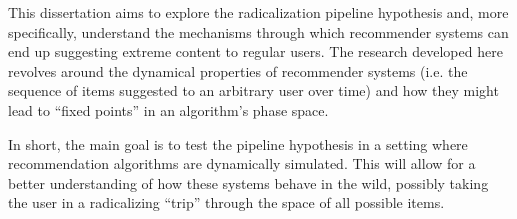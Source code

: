 This dissertation aims to explore the radicalization pipeline hypothesis and,
more specifically, understand the mechanisms through which recommender systems
can end up suggesting extreme content to regular users. The research developed
here revolves around the dynamical properties of recommender systems (i.e. the
sequence of items suggested to an arbitrary user over time) and how they might
lead to ``fixed points'' in an algorithm's phase space.

In short, the main goal is to test the pipeline hypothesis in a setting where
recommendation algorithms are dynamically simulated. This will allow for a
better understanding of how these systems behave in the wild, possibly taking
the user in a radicalizing ``trip'' through the space of all possible items.
